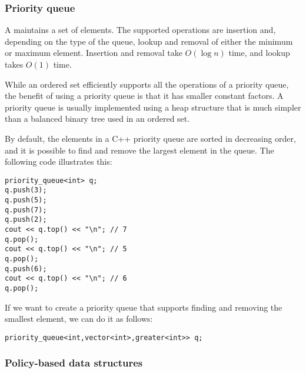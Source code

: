 \subsubsection{Priority queue}


A 
maintains a set of elements.
The supported operations are insertion and,
depending on the type of the queue,
lookup and removal of
either the minimum or maximum element.
Insertion and removal take $O(\log n)$ time,
and lookup takes $O(1)$ time.

While an ordered set efficiently supports
all the operations of a priority queue,
the benefit of using a priority queue is
that it has smaller constant factors.
A priority queue is usually implemented using
a heap structure that is much simpler than a
balanced binary tree used in an ordered set.

\begin{samepage}
By default, the elements in a C++
priority queue are sorted in decreasing order,
and it is possible to find and remove the
largest element in the queue.
The following code illustrates this:

\begin{lstlisting}
priority_queue<int> q;
q.push(3);
q.push(5);
q.push(7);
q.push(2);
cout << q.top() << "\n"; // 7
q.pop();
cout << q.top() << "\n"; // 5
q.pop();
q.push(6);
cout << q.top() << "\n"; // 6
q.pop();
\end{lstlisting}
\end{samepage}

If we want to create a priority queue
that supports finding and removing
the smallest element,
we can do it as follows:

\begin{lstlisting}
priority_queue<int,vector<int>,greater<int>> q;
\end{lstlisting}

\subsubsection{Policy-based data structures}

